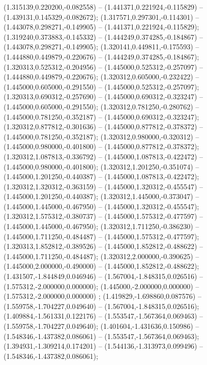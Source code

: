 (1.315139,0.220200,-0.082558) -- (1.441371,0.221924,-0.115829) -- (1.439131,0.145329,-0.082672);
 (1.317571,0.297301,-0.114301) -- (1.443078,0.298271,-0.149905) -- (1.441371,0.221924,-0.115829);
 (1.319240,0.373883,-0.145332) -- (1.444249,0.374285,-0.184867) -- (1.443078,0.298271,-0.149905);
 (1.320141,0.449811,-0.175593) -- (1.444880,0.449879,-0.220676) -- (1.444249,0.374285,-0.184867);
 (1.320313,0.525312,-0.204956) -- (1.445000,0.525312,-0.257097) -- (1.444880,0.449879,-0.220676);
 (1.320312,0.605000,-0.232422) -- (1.445000,0.605000,-0.291550) -- (1.445000,0.525312,-0.257097);
 (1.320313,0.690312,-0.257690) -- (1.445000,0.690312,-0.323247) -- (1.445000,0.605000,-0.291550);
 (1.320312,0.781250,-0.280762) -- (1.445000,0.781250,-0.352187) -- (1.445000,0.690312,-0.323247);
 (1.320312,0.877812,-0.301636) -- (1.445000,0.877812,-0.378372) -- (1.445000,0.781250,-0.352187);
 (1.320312,0.980000,-0.320312) -- (1.445000,0.980000,-0.401800) -- (1.445000,0.877812,-0.378372);
 (1.320312,1.087813,-0.336792) -- (1.445000,1.087813,-0.422472) -- (1.445000,0.980000,-0.401800);
 (1.320312,1.201250,-0.351074) -- (1.445000,1.201250,-0.440387) -- (1.445000,1.087813,-0.422472);
 (1.320312,1.320312,-0.363159) -- (1.445000,1.320312,-0.455547) -- (1.445000,1.201250,-0.440387);
 (1.320312,1.445000,-0.373047) -- (1.445000,1.445000,-0.467950) -- (1.445000,1.320312,-0.455547);
 (1.320312,1.575312,-0.380737) -- (1.445000,1.575312,-0.477597) -- (1.445000,1.445000,-0.467950);
 (1.320312,1.711250,-0.386230) -- (1.445000,1.711250,-0.484487) -- (1.445000,1.575312,-0.477597);
 (1.320313,1.852812,-0.389526) -- (1.445000,1.852812,-0.488622) -- (1.445000,1.711250,-0.484487);
 (1.320312,2.000000,-0.390625) -- (1.445000,2.000000,-0.490000) -- (1.445000,1.852812,-0.488622);
 (1.431507,-1.844849,0.046946) -- (1.567004,-1.848315,0.026516) -- (1.575312,-2.000000,0.000000);
 (1.445000,-2.000000,0.000000) -- (1.575312,-2.000000,0.000000) ;
 (1.419829,-1.698860,0.087576) -- (1.559758,-1.704227,0.049640) -- (1.567004,-1.848315,0.026516);
 (1.409884,-1.561331,0.122176) -- (1.553547,-1.567364,0.069463) -- (1.559758,-1.704227,0.049640);
 (1.401604,-1.431636,0.150986) -- (1.548346,-1.437382,0.086061) -- (1.553547,-1.567364,0.069463);
 (1.394931,-1.309214,0.174201) -- (1.544136,-1.313973,0.099496) -- (1.548346,-1.437382,0.086061);
